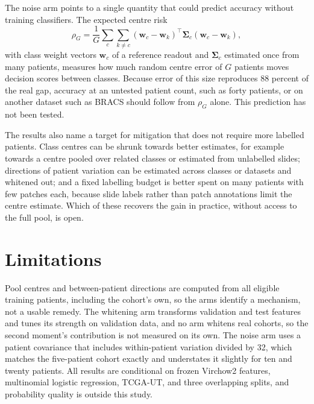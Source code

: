 \documentclass[11pt]{article}
\begin{document}
The noise arm points to a single quantity that could predict accuracy without training classifiers. The expected centre risk
\begin{equation}
  \rho_G=\frac1G\sum_c\sum_{k\neq c}(\mathbf w_c-\mathbf w_k)^{\top}\boldsymbol\Sigma_c(\mathbf w_c-\mathbf w_k),
  \label{eq:risk}
\end{equation}
\noindent with class weight vectors $\mathbf w_c$ of a reference readout and $\boldsymbol\Sigma_c$ estimated once from many patients, measures how much random centre error of $G$ patients moves decision scores between classes. Because error of this size reproduces 88 percent of the real gap, accuracy at an untested patient count, such as forty patients, or on another dataset such as BRACS should follow from $\rho_G$ alone. This prediction has not been tested.

The results also name a target for mitigation that does not require more labelled patients. Class centres can be shrunk towards better estimates, for example towards a centre pooled over related classes or estimated from unlabelled slides; directions of patient variation can be estimated across classes or datasets and whitened out; and a fixed labelling budget is better spent on many patients with few patches each, because slide labels rather than patch annotations limit the centre estimate. Which of these recovers the gain in practice, without access to the full pool, is open.

\section{Limitations}
\label{sec:limitations}
Pool centres and between-patient directions are computed from all eligible training patients, including the cohort's own, so the arms identify a mechanism, not a usable remedy. The whitening arm transforms validation and test features and tunes its strength on validation data, and no arm whitens real cohorts, so the second moment's contribution is not measured on its own. The noise arm uses a patient covariance that includes within-patient variation divided by 32, which matches the five-patient cohort exactly and understates it slightly for ten and twenty patients. All results are conditional on frozen Virchow2 features, multinomial logistic regression, TCGA-UT, and three overlapping splits, and probability quality is outside this study.



\end{document}
